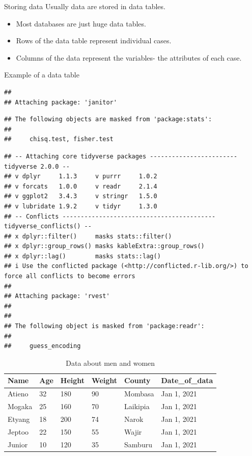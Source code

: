 \documentclass[
  ignorenonframetext,
]{beamer}
\begin{document}
\begin{frame}{Storing data}
\protect\hypertarget{storing-data}{}
Usually data are stored in data tables.

\begin{itemize}
\item
  Most databases are just huge data tables.
\item
  Rows of the data table represent individual cases.
\item
  Columns of the data represent the variables- the attributes of each
  case.
\end{itemize}
\end{frame}

\begin{frame}[fragile]{Example of a data table}
\protect\hypertarget{example-of-a-data-table}{}
\begin{verbatim}
## 
## Attaching package: 'janitor'
\end{verbatim}

\begin{verbatim}
## The following objects are masked from 'package:stats':
## 
##     chisq.test, fisher.test
\end{verbatim}

\begin{verbatim}
## -- Attaching core tidyverse packages ------------------------ tidyverse 2.0.0 --
## v dplyr     1.1.3     v purrr     1.0.2
## v forcats   1.0.0     v readr     2.1.4
## v ggplot2   3.4.3     v stringr   1.5.0
## v lubridate 1.9.2     v tidyr     1.3.0
## -- Conflicts ------------------------------------------ tidyverse_conflicts() --
## x dplyr::filter()     masks stats::filter()
## x dplyr::group_rows() masks kableExtra::group_rows()
## x dplyr::lag()        masks stats::lag()
## i Use the conflicted package (<http://conflicted.r-lib.org/>) to force all conflicts to become errors
## 
## Attaching package: 'rvest'
## 
## 
## The following object is masked from 'package:readr':
## 
##     guess_encoding
\end{verbatim}

\begin{table}

\caption{\label{tab:unnamed-chunk-1}Data about men and women}
\centering
\begin{tabular}[t]{l|l|l|l|l|l}
\hline
Name & Age & Height & Weight & County & Date\_of\_data\\
\hline
Atieno & 32 & 180 & 90 & Mombasa & Jan 1, 2021\\
\hline
Mogaka & 25 & 160 & 70 & Laikipia & Jan 1, 2021\\
\hline
Etyang & 18 & 200 & 74 & Narok & Jan 1, 2021\\
\hline
Jeptoo & 22 & 150 & 55 & Wajir & Jan 1, 2021\\
\hline
Junior & 10 & 120 & 35 & Samburu & Jan 1, 2021\\
\hline
\end{tabular}
\end{table}
\end{frame}
\end{document}
